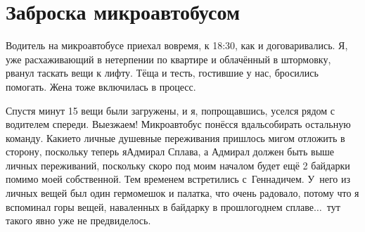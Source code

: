 \chapter{Заброска микроавтобусом} 
\vspace{-1cm}
\vepsianrose

Водитель на микроавтобусе приехал вовремя, к 18:30, как и договаривались. Я, уже расхаживающий в нетерпении по квартире и облачённый в штормовку, рванул таскать вещи к лифту. Тёща и тесть, гостившие у нас, бросились помогать. Жена тоже включилась в процесс. 

%
%
%
%
%


Спустя минут 15 вещи были загружены, и я, попрощавшись, уселся рядом с водителем спереди. Выезжаем! Микроавтобус понёсся вдаль\mdash собирать остальную команду. Какие\sdash то личные душевные переживания пришлось мигом отложить в сторону, поскольку теперь я\mdash Адмирал Сплава, а Адмирал должен быть выше личных переживаний, поскольку скоро под моим началом будет ещё 2 байдарки помимо моей собственной. Тем временем встретились с~Геннадичем. У~него из личных вещей был один гермомешок и палатка, что очень радовало, потому что я вспоминал горы вещей, наваленных в байдарку в прошлогоднем сплаве$\ldots$~тут такого явно уже не предвиделось.  

